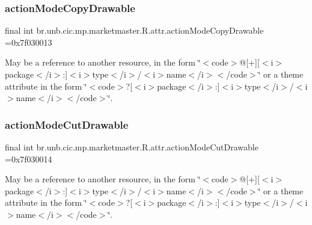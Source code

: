 \subsubsection{\texorpdfstring{action\+Mode\+Copy\+Drawable}{actionModeCopyDrawable}}
{\footnotesize\ttfamily final int br.\+unb.\+cic.\+mp.\+marketmaster.\+R.\+attr.\+action\+Mode\+Copy\+Drawable =0x7f030013\hspace{0.3cm}{\ttfamily [static]}}

May be a reference to another resource, in the form \char`\"{}$<$code$>$@\mbox{[}+\mbox{]}\mbox{[}$<$i$>$package$<$/i$>$\+:\mbox{]}$<$i$>$type$<$/i$>$/$<$i$>$name$<$/i$>$$<$/code$>$\char`\"{} or a theme attribute in the form \char`\"{}$<$code$>$?\mbox{[}$<$i$>$package$<$/i$>$\+:\mbox{]}$<$i$>$type$<$/i$>$/$<$i$>$name$<$/i$>$$<$/code$>$\char`\"{}. \mbox{\label{classbr_1_1unb_1_1cic_1_1mp_1_1marketmaster_1_1R_1_1attr_a4faf4665b978e118c7d110e5c530bd58}} 
\subsubsection{\texorpdfstring{action\+Mode\+Cut\+Drawable}{actionModeCutDrawable}}
{\footnotesize\ttfamily final int br.\+unb.\+cic.\+mp.\+marketmaster.\+R.\+attr.\+action\+Mode\+Cut\+Drawable =0x7f030014\hspace{0.3cm}{\ttfamily [static]}}

May be a reference to another resource, in the form \char`\"{}$<$code$>$@\mbox{[}+\mbox{]}\mbox{[}$<$i$>$package$<$/i$>$\+:\mbox{]}$<$i$>$type$<$/i$>$/$<$i$>$name$<$/i$>$$<$/code$>$\char`\"{} or a theme attribute in the form \char`\"{}$<$code$>$?\mbox{[}$<$i$>$package$<$/i$>$\+:\mbox{]}$<$i$>$type$<$/i$>$/$<$i$>$name$<$/i$>$$<$/code$>$\char`\"{}. \mbox{\label{classbr_1_1unb_1_1cic_1_1mp_1_1marketmaster_1_1R_1_1attr_adf94a3776a3a559d4952dd7960e7c80f}} 
